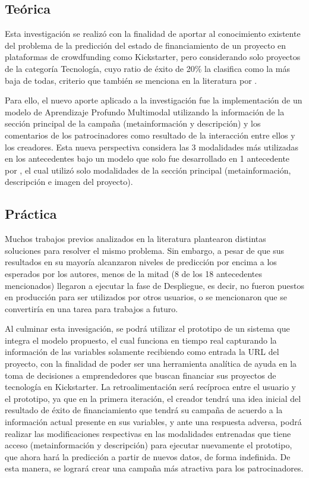 \subsection{Teórica}
Esta investigación se realizó con la finalidad de aportar al conocimiento existente del problema de la predicción del estado de financiamiento de un proyecto en plataformas de crowdfunding como Kickstarter, pero considerando solo proyectos de la categoría Tecnología, cuyo ratio de éxito de 20\% la clasifica como la más baja de todas, criterio que también se menciona en la literatura por \cite{pr_lee2018contentDL}.

Para ello, el nuevo aporte aplicado a la investigación fue la implementación de un modelo de Aprendizaje Profundo Multimodal utilizando la información de la sección principal de la campaña (metainformación y descripción) y los comentarios de los patrocinadores como resultado de la interacción entre ellos y los creadores. Esta nueva perspectiva considera las 3 modalidades más utilizadas en los antecedentes bajo un modelo que solo fue desarrollado en 1 antecedente por \cite{pr_cheng2019deeplearning}, el cual utilizó solo modalidades de la sección principal (metainformación, descripción e imagen del proyecto).

\subsection{Práctica}
Muchos trabajos previos analizados en la literatura plantearon distintas soluciones para resolver el mismo problema. Sin embargo, a pesar de que sus resultados en su mayoría alcanzaron niveles de predicción por encima a los esperados por los autores, menos de la mitad (8 de los 18 antecedentes mencionados) llegaron a ejecutar la fase de Despliegue, es decir, no fueron puestos en producción para ser utilizados por otros usuarios, o se mencionaron que se convertiría en una tarea para trabajos a futuro.

Al culminar esta invesigación, se podrá utilizar el prototipo de un sistema que integra el modelo propuesto, el cual funciona en tiempo real capturando la información de las variables solamente recibiendo como entrada la URL del proyecto, con la finalidad de poder ser una herramienta analítica de ayuda en la toma de decisiones a emprendedores que buscan financiar sus proyectos de tecnología en Kickstarter. La retroalimentación será recíproca entre el usuario y el prototipo, ya que en la primera iteración, el creador tendrá una idea inicial del resultado de éxito de financiamiento que tendrá su campaña de acuerdo a la información actual presente en sus variables, y ante una respuesta adversa, podrá realizar las modificaciones respectivas en las modalidades entrenadas que tiene acceso (metainformación y descripción) para ejecutar nuevamente el prototipo, que ahora hará la predicción a partir de nuevos datos, de forma indefinida. De esta manera, se logrará crear una campaña más atractiva para los patrocinadores.

